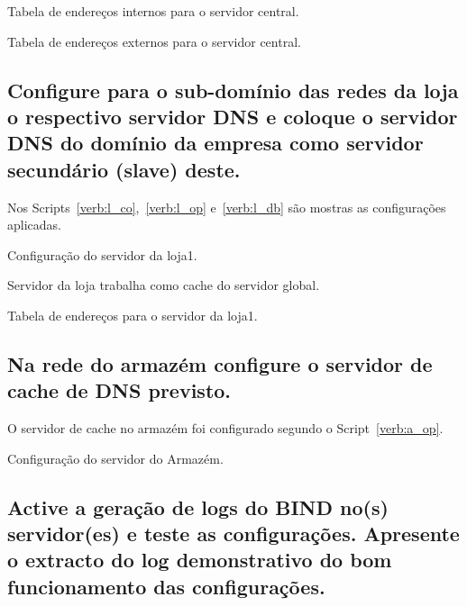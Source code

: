 \documentclass[a4paper,12pt]{article}
\begin{document}
\begin{program}
   
   \caption{Tabela de endereços internos para o servidor central.}
   \label{verb:s_dbin}
\end{program}

\begin{program}
   
   \caption{Tabela de endereços externos para o servidor central.}
   \label{verb:s_dbout}
\end{program}

\subsection{Configure para o sub-domínio das redes da loja o respectivo servidor DNS e
coloque o servidor DNS do domínio da empresa como servidor secundário
(slave) deste.}

Nos Scripts~\ref{verb:l_co},~\ref{verb:l_op} e~\ref{verb:l_db} são
mostras as configurações aplicadas.

\begin{program}
   
   \caption{Configuração do servidor da loja1.}
   \label{verb:l_co}
\end{program}

\begin{program}
   
   \caption{Servidor da loja trabalha como cache do servidor global.}
   \label{verb:l_op}
\end{program}

\begin{program}
   
   \caption{Tabela de endereços para o servidor da loja1.}
   \label{verb:l_db}
\end{program}

\subsection{Na rede do armazém configure o servidor de cache de DNS previsto.}
O servidor de cache no armazém foi configurado segundo o Script~\ref{verb:a_op}.

\begin{program}
   
   \caption{Configuração do servidor do Armazém.}
   \label{verb:a_op}
\end{program}

\subsection{Active a geração de logs do BIND no(s) servidor(es) e teste as configurações.
Apresente o extracto do log demonstrativo do bom funcionamento das
configurações.}
\end{document}
